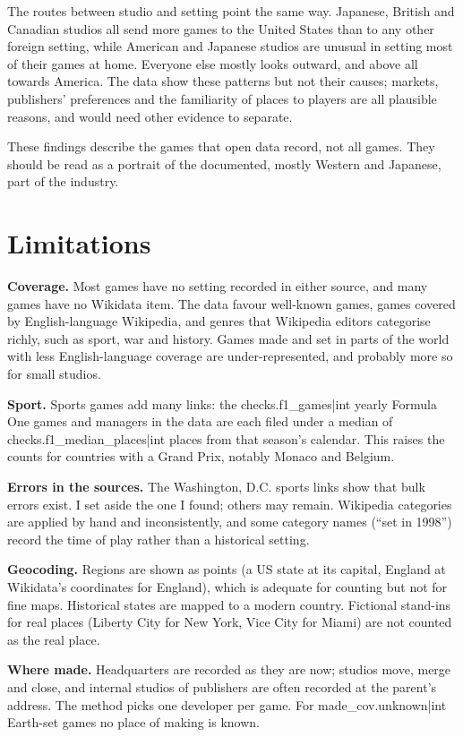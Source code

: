 \documentclass[11pt,a4paper]{article}
\begin{document}
The routes between studio and setting point the same way. Japanese, British and Canadian studios all send more games to the United States than to any other foreign setting, while American and Japanese studios are unusual in setting most of their games at home. Everyone else mostly looks outward, and above all towards America. The data show these patterns but not their causes; markets, publishers' preferences and the familiarity of places to players are all plausible reasons, and would need other evidence to separate.

These findings describe the games that open data record, not all games. They should be read as a portrait of the documented, mostly Western and Japanese, part of the industry.

\section{Limitations}

\textbf{Coverage.} Most games have no setting recorded in either source, and many games have no Wikidata item. The data favour well-known games, games covered by English-language Wikipedia, and genres that Wikipedia editors categorise richly, such as sport, war and history. Games made and set in parts of the world with less English-language coverage are under-represented, and probably more so for small studios.

\textbf{Sport.} Sports games add many links: the {{checks.f1_games|int}} yearly Formula One games and managers in the data are each filed under a median of {{checks.f1_median_places|int}} places from that season's calendar. This raises the counts for countries with a Grand Prix, notably Monaco and Belgium.

\textbf{Errors in the sources.} The Washington, D.C. sports links show that bulk errors exist. I set aside the one I found; others may remain. Wikipedia categories are applied by hand and inconsistently, and some category names (``set in 1998'') record the time of play rather than a historical setting.

\textbf{Geocoding.} Regions are shown as points (a US state at its capital, England at Wikidata's coordinates for England), which is adequate for counting but not for fine maps. Historical states are mapped to a modern country. Fictional stand-ins for real places (Liberty City for New York, Vice City for Miami) are not counted as the real place.

\textbf{Where made.} Headquarters are recorded as they are now; studios move, merge and close, and internal studios of publishers are often recorded at the parent's address. The method picks one developer per game. For {{made_cov.unknown|int}} Earth-set games no place of making is known.
\end{document}
